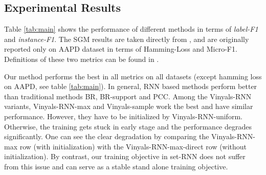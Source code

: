 

\subsection{Experimental Results}


Table \ref{tab:main} shows the performance of different methods in terms of \emph{label-F1} and \emph{instance-F1}. The SGM results are taken directly from \cite{DBLP:journals/corr/abs-1806-04822}, and are originally reported only on AAPD dataset in terms of Hamming-Loss and Micro-F1. Definitions of these two metrics can be found in \cite{koyejo2015consistent}.  

 
Our method performs the best in all metrics on all datasets (except hamming loss on AAPD, see table \ref{tab:main}). In general, RNN based methods perform better than traditional methods BR, BR-support and PCC. Among the Vinyals-RNN variants, Vinyals-RNN-max and Vinyals-sample work the best and have similar performance. However, they have to be initialized by Vinyals-RNN-uniform. Otherwise, the training gets stuck in early stage and the performance degrades significantly. One can see the clear degradation by comparing the Vinyals-RNN-max row (with initialization) with the Vinyals-RNN-max-direct row (without initialization). By contrast, our training objective in set-RNN does not suffer from this issue and can serve as a stable stand alone training objective.

